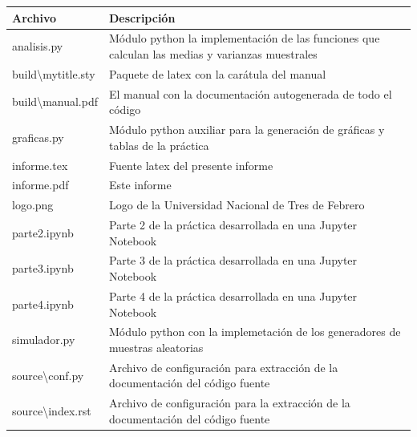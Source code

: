 \documentclass[11pt]{article}
\begin{document}
\begin{table}[]
    \begin{tabular}{|l|p{0.5\paperwidth}|}
    \hline
    \textbf{Archivo}                 & \textbf{Descripción}                                                                            \\ \hline
    {\ttfamily analisis.py}                      & Módulo python la implementación de las funciones que calculan las medias y varianzas muestrales \\ \hline
    {\ttfamily build\textbackslash{}mytitle.sty} & Paquete de latex con la carátula del manual                                                     \\ \hline
    {\ttfamily build\textbackslash{}manual.pdf}  & El manual con la documentación autogenerada de todo el código                                   \\ \hline
    {\ttfamily graficas.py}                      & Módulo python auxiliar para la generación de gráficas y tablas de la práctica                   \\ \hline
    {\ttfamily informe.tex}                      & Fuente latex del presente informe                                                               \\ \hline
    {\ttfamily informe.pdf}                      & Este informe                                                                                    \\ \hline
    {\ttfamily logo.png}                         & Logo de la Universidad Nacional de Tres de Febrero                                              \\ \hline
    {\ttfamily parte2.ipynb}                     & Parte 2 de la práctica desarrollada en una Jupyter Notebook                                     \\ \hline
    {\ttfamily parte3.ipynb}                     & Parte 3 de la práctica desarrollada en una Jupyter Notebook                                     \\ \hline
    {\ttfamily parte4.ipynb}                     & Parte 4 de la práctica desarrollada en una Jupyter Notebook                                     \\ \hline
    {\ttfamily simulador.py}                     & Módulo python con la implemetación de los generadores de muestras aleatorias                    \\ \hline
    {\ttfamily source\textbackslash{}conf.py}    & Archivo de configuración para extracción de la documentación del código fuente                  \\ \hline
    {\ttfamily source\textbackslash{}index.rst}  & Archivo de configuración para la extracción de la documentación del código fuente               \\ \hline
    \end{tabular}
    \end{table}
\end{document}
